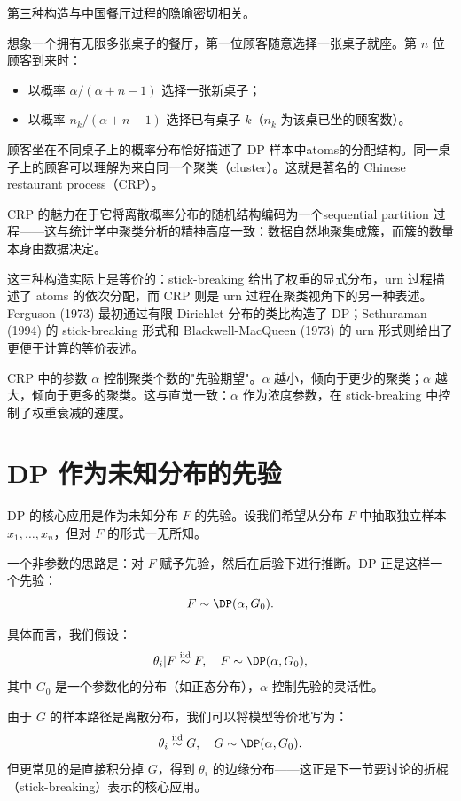 第三种构造与中国餐厅过程的隐喻密切相关。

想象一个拥有无限多张桌子的餐厅，第一位顾客随意选择一张桌子就座。第 $n$ 位顾客到来时：
\begin{itemize}
  \item 以概率 $\alpha/(\alpha + n - 1)$ 选择一张新桌子；
  \item 以概率 $n_k/(\alpha + n - 1)$ 选择已有桌子 $k$（$n_k$ 为该桌已坐的顾客数）。
\end{itemize}

顾客坐在不同桌子上的概率分布恰好描述了 DP 样本中atoms的分配结构。同一桌子上的顾客可以理解为来自同一个聚类（cluster）。这就是著名的 Chinese restaurant process（CRP）。

CRP 的魅力在于它将离散概率分布的随机结构编码为一个sequential partition 过程——这与统计学中聚类分析的精神高度一致：数据自然地聚集成簇，而簇的数量本身由数据决定。

这三种构造实际上是等价的：stick-breaking 给出了权重的显式分布，urn 过程描述了 atoms 的依次分配，而 CRP 则是 urn 过程在聚类视角下的另一种表述。Ferguson (1973) 最初通过有限 Dirichlet 分布的类比构造了 DP；Sethuraman (1994) 的 stick-breaking 形式和 Blackwell-MacQueen (1973) 的 urn 形式则给出了更便于计算的等价表述。

\begin{Remark}
CRP 中的参数 $\alpha$ 控制聚类个数的"先验期望"。$\alpha$ 越小，倾向于更少的聚类；$\alpha$ 越大，倾向于更多的聚类。这与直觉一致：$\alpha$ 作为浓度参数，在 stick-breaking 中控制了权重衰减的速度。
\end{Remark}

\section{DP 作为未知分布的先验}

DP 的核心应用是作为未知分布 $F$ 的先验。设我们希望从分布 $F$ 中抽取独立样本 $x_1, \ldots, x_n$，但对 $F$ 的形式一无所知。

一个非参数的思路是：对 $F$ 赋予先验，然后在后验下进行推断。DP 正是这样一个先验：
\[
F \sim \DP(\alpha, G_0).
\]

具体而言，我们假设：
\[
\theta_i | F \stackrel{\mathrm{iid}}{\sim} F, \quad F \sim \DP(\alpha, G_0),
\]
其中 $G_0$ 是一个参数化的分布（如正态分布），$\alpha$ 控制先验的灵活性。

由于 $G$ 的样本路径是离散分布，我们可以将模型等价地写为：
\[
\theta_i \stackrel{\mathrm{iid}}{\sim} G, \quad G \sim \DP(\alpha, G_0).
\]
但更常见的是直接积分掉 $G$，得到 $\theta_i$ 的边缘分布——这正是下一节要讨论的折棍（stick-breaking）表示的核心应用。

